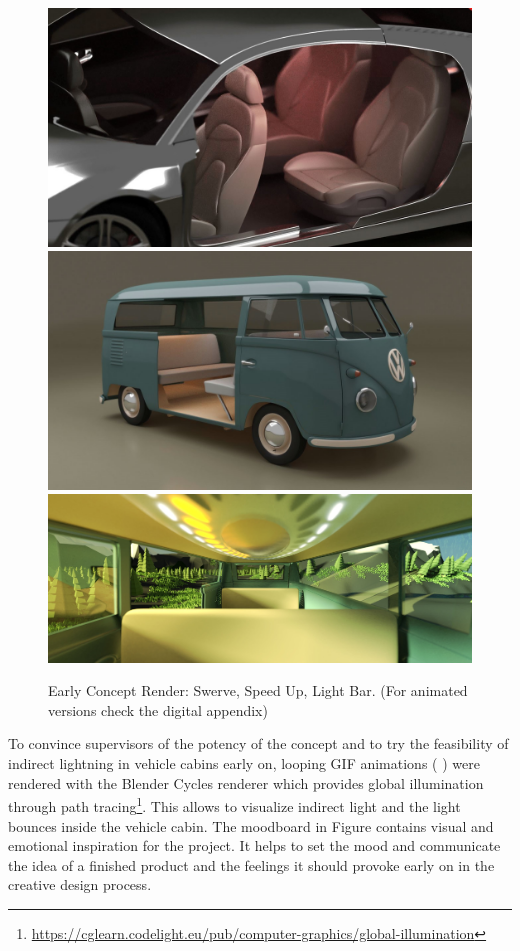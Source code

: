 \begin{figure}
    \includegraphics[height=0.28\textwidth]{fig/swerve_Mittel.jpg}\hfill\includegraphics[height=0.28\textwidth]{fig/busLight_Mittel.jpg}\newline\includegraphics[width=1\textwidth]{fig/0013GRADIENTcut.jpg}
    \caption[Early Concept Render]{Early Concept Render: Swerve, Speed Up, Light Bar. (For animated versions check the digital appendix)}
    \label{fig:conceptrender}
\end{figure}

To convince supervisors of the potency of the concept and to try the feasibility of indirect lightning in vehicle cabins early on, looping GIF animations ( ) were rendered with the Blender Cycles renderer which provides global illumination through path tracing\footnote{\url{https://cglearn.codelight.eu/pub/computer-graphics/global-illumination}}. This allows to visualize indirect light and the light bounces inside the vehicle cabin. The moodboard in Figure  contains visual and emotional inspiration for the project. It helps to set the mood and communicate the idea of a finished product and the feelings it should provoke early on in the creative design process\cite{Cassidy2011TheTool}. 

